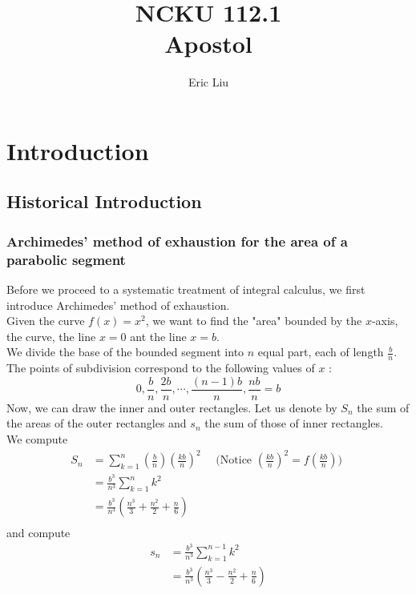 \documentclass{report}
\title{\Huge{NCKU 112.1}\\Apostol}
\author{\huge{Eric Liu}}
\date{}
\begin{document}
\maketitle
\newpage%
\tableofcontents
\pagebreak
\chapter{Introduction}
\section{Historical Introduction}
\subsection{Archimedes' method of exhaustion for the area of a parabolic segment}
Before we proceed to a systematic treatment of integral calculus, we first introduce Archimedes' method of exhaustion.\\

Given the curve $f(x)=x^2$, we want to find the "area" bounded by the $x$-axis, the curve, the line $x=0$ ant the line $x=b$.\\

We divide the base of the bounded segment into  $n$ equal part, each of length $\frac{b}{n}$. The points of subdivision correspond to the following values of $x$ :
\begin{equation}
  0,\frac{b}{n},\frac{2b}{n},\cdots ,\frac{(n-1)b}{n}, \frac{nb}{n}=b
\end{equation}
Now, we can draw the inner and outer rectangles. Let us denote by $S_n$ the sum of the areas of the outer rectangles and $s_n$ the sum of those of inner rectangles.\\

We compute
\begin{align}
  S_n &= \sum_{k=1}^{n} (\frac{b}{n})(\frac{kb}{n})^2 \quad\text{ (Notice  $(\frac{kb}{n})^2=f(\frac{kb}{n})$) }\\
      &= \frac{b^3}{n^3}\sum_{k=1}^{n}k^2\\
      &= \frac{b^3}{n^3}(\frac{n^3}{3}+\frac{n^2}{2}+\frac{n}{6})\\
\end{align}
and compute
\begin{align}
  s_n &= \frac{b^3}{n^3}\sum_{k=1}^{n-1}k^2\\
      &= \frac{b^3}{n^3}(\frac{n^3}{3}-\frac{n^2}{2}+\frac{n}{6})
\end{align} 
\end{document}
